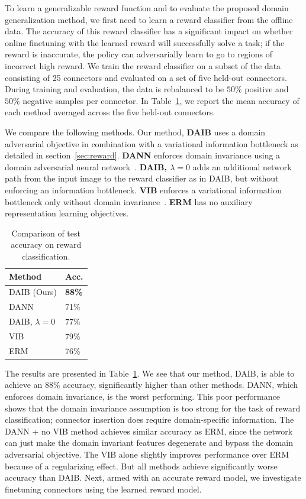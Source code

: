 To learn a generalizable reward function and to evaluate the proposed domain generalization method, we first need to learn a reward classifier from the offline data. 
The accuracy of this reward classifier has a significant impact on whether online finetuning with the learned reward will successfully solve a task; if the reward is inaccurate, the policy can adversarially learn to go to regions of incorrect high reward.
We train the reward classifier on a subset of the data consisting of 25 connectors and evaluated on a set of five held-out connectors.
During training and evaluation, the data is rebalanced to be $50\%$ positive and $50\%$ negative samples per connector.
In Table~\ref{tab:reward}, we report the mean accuracy of each method averaged across the five held-out connectors.

We compare the following methods.
Our method, \textbf{DAIB} uses a domain adversarial objective in combination with a variational information bottleneck as detailed in section~\ref{sec:reward}. \textbf{DANN} enforces domain invariance using a domain adversarial neural network~\cite{ganin2016domainadversarial}. \textbf{DAIB, $\lambda=0$} adds an additional network path from the input image to the reward classifier as in DAIB, but without enforcing an information bottleneck. \textbf{VIB} enforces a variational information bottleneck only without domain invariance~\cite{alemi2017vib}. \textbf{ERM} has no auxiliary representation learning objectives.

\begin{table}
\begin{tabular}{l|l}
Method   & Acc. \\ \hline
DAIB (Ours) & \textbf{88\%}     \\
DANN          & 71\%     \\
DAIB, $\lambda=0$    & 77\%     \\
VIB         & 79\%     \\
ERM             & 76\%    
\end{tabular}
\caption{Comparison of test accuracy on reward classification.}
\label{tab:reward}
\end{table}
The results are presented in Table~\ref{tab:reward}. We see that our method, DAIB, is able to achieve an $88\%$ accuracy, significantly higher than other methods. DANN, which enforces domain invariance, is the worst performing. This poor performance shows that the domain invariance assumption is too strong for the task of reward classification; connector insertion does require domain-specific information. The DANN + no VIB
method achieves similar accuracy as ERM, since the network can just make the domain invariant features degenerate and bypass the domain adversarial objective.
The VIB alone slightly improves performance over ERM because of a regularizing effect. But all methods achieve significantly worse accuracy than DAIB. Next, armed with an accurate reward model, we investigate finetuning connectors using the learned reward model.

